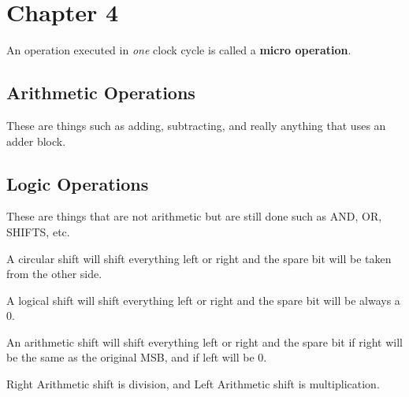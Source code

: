 \documentclass[12pt,letterpaper]{article} \usepackage{amsmath} \usepackage{graphicx} \usepackage[margin=1in]{geometry} \usepackage{longtable}  \usepackage{amssymb}
\begin{document}
		\section{Chapter 4}
		
		An operation executed in \textit{one} clock cycle is called a \textbf{micro operation}.
		
		\subsection{Arithmetic Operations}
		These are things such as adding, subtracting, and really anything that uses an adder block.
		
		\subsection{Logic Operations}
		These are things that are not arithmetic but are still done such as AND, OR, SHIFTS, etc.
		
		A circular shift will shift everything left or right and the spare bit will be taken from the other side.
		
		A logical shift will shift everything left or right and the spare bit will be always a 0.
		
		An arithmetic shift will shift everything left or right and the spare bit if right will be the same as the original MSB, and if left will be 0.
		
		Right Arithmetic shift is division, and Left Arithmetic shift is multiplication.
		
		
		
	
	
	
	
\end{document}

